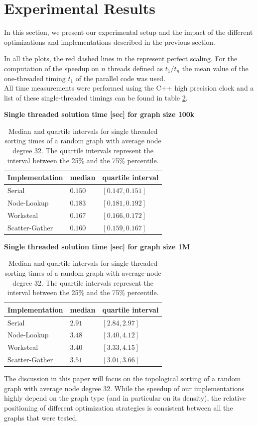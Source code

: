 \section{Experimental Results}\label{sec:exp}
%
In this section, we present our experimental setup and the impact of the different optimizations and implementations described in the previous section.

In all the plots, the red dashed lines in the represent perfect scaling.
For the computation of the speedup on $n$ threads defined as $t_1/t_n$ the mean value of the one-threaded timing $t_1$ of the parallel code was used.\\
All time measurements were performed using the C++ high precision clock and a list of these single-threaded timings can be found in table \ref{tab:t1timings}.
\par\medskip

  \begin{table}[h]
	  \textbf{Single threaded solution time [sec] for graph size 100k}
    \centering
    \begin{tabular}{lll}
		Implementation	& median & quartile interval \\
    \toprule
	Serial				& $0.150$ & $[0.147,0.151]$ \\
	Node-Lookup			& $0.183$ & $[0.181,0.192]$ \\
	Worksteal			& $0.167$ & $[0.166,0.172]$ \\
	Scatter-Gather		& $0.160$ & $[0.159,0.167]$ \\
    \bottomrule
    \end{tabular}
    \par\medskip
	  \textbf{Single threaded solution time [sec] for graph size 1M}
    \centering
    \begin{tabular}{lll}
		Implementation	& median & quartile interval \\
    \toprule
	Serial				& $2.91$ & $[2.84,2.97]$ \\
	Node-Lookup			& $3.48$ & $[3.40,4.12]$ \\
	Worksteal			& $3.40$ & $[3.33,4.15]$ \\
	Scatter-Gather		& $3.51$ & $[3.01,3.66]$ \\
    \bottomrule
    \end{tabular}
    \par\medskip
    \caption{Median and quartile intervals for single threaded sorting times of a random graph with average node degree 32. The quartile intervals represent the interval between the 25\% and the 75\% percentile.}
    \label{tab:t1timings}
  \end{table}
\par\medskip
The discussion in this paper will focus on the topological sorting of a random graph with average node degree 32.
While the speedup of our implementations highly depend on the graph type (and in particular on its density), the relative positioning of different optimization strategies is consistent between all the graphs that were tested.


